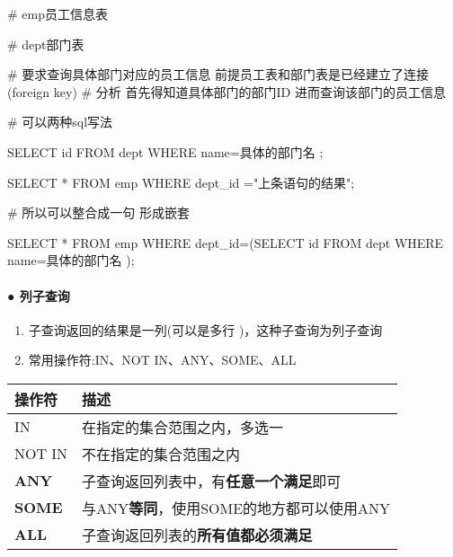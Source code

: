 \documentclass[
  letterpaper,
  DIV=11,
  numbers=noendperiod]{scrreprt}
\let\oldparagraph\paragraph
\renewcommand{\paragraph}[1]{\oldparagraph{#1}\mbox{}}
\newenvironment{Shaded}{\begin{snugshade}}{\end{snugshade}}
\newcommand{\KeywordTok}[1]{\textcolor[rgb]{0.00,0.23,0.31}{#1}}
\newcommand{\NormalTok}[1]{\textcolor[rgb]{0.00,0.23,0.31}{#1}}
\newcommand{\OperatorTok}[1]{\textcolor[rgb]{0.37,0.37,0.37}{#1}}
\newcommand{\OtherTok}[1]{\textcolor[rgb]{0.00,0.23,0.31}{#1}}
\newcommand{\StringTok}[1]{\textcolor[rgb]{0.13,0.47,0.30}{#1}}
\begin{document}
\begin{Shaded}
\begin{Highlighting}[]
\NormalTok{\# emp员工信息表}

\NormalTok{\# dept部门表}

\NormalTok{\# 要求查询具体部门对应的员工信息 前提员工表和部门表是已经建立了连接(}\KeywordTok{foreign} \KeywordTok{key}\NormalTok{) \# 分析 首先得知道具体部门的部门ID 进而查询该部门的员工信息}

\NormalTok{\# 可以两种sql写法}

\KeywordTok{SELECT} \KeywordTok{id} \KeywordTok{FROM}\NormalTok{ dept }\KeywordTok{WHERE}\NormalTok{ name}\OperatorTok{=}\StringTok{\textquotesingle{}具体的部门名 \textquotesingle{}}\NormalTok{;}

\KeywordTok{SELECT} \OperatorTok{*} \KeywordTok{FROM}\NormalTok{ emp }\KeywordTok{WHERE}\NormalTok{ dept\_id }\OperatorTok{=}\OtherTok{"上条语句的结果"}\NormalTok{;}

\NormalTok{\# 所以可以整合成一句 形成嵌套}

\KeywordTok{SELECT} \OperatorTok{*} \KeywordTok{FROM}\NormalTok{ emp }\KeywordTok{WHERE}\NormalTok{ dept\_id}\OperatorTok{=}\NormalTok{(}\KeywordTok{SELECT} \KeywordTok{id} \KeywordTok{FROM}\NormalTok{ dept }\KeywordTok{WHERE}\NormalTok{ name}\OperatorTok{=}\StringTok{\textquotesingle{}具体的部门名 \textquotesingle{}}\NormalTok{);}
\end{Highlighting}
\end{Shaded}

\hypertarget{ux5217ux5b50ux67e5ux8be2}{%
\paragraph{\texorpdfstring{\textbf{●
列子查询}}{● 列子查询}}\label{ux5217ux5b50ux67e5ux8be2}}

\begin{enumerate}
\def\labelenumi{\arabic{enumi}.}
\item
  子查询返回的结果是一列(可以是多行 )，这种子查询为列子查询
\item
  常用操作符:IN、NOT IN、ANY、SOME、ALL
\end{enumerate}

\begin{longtable}[]{@{}ll@{}}
\toprule\noalign{}
\textbf{操作符} & \textbf{描述} \\
\midrule\noalign{}
\endhead
\bottomrule\noalign{}
\endlastfoot
IN & 在指定的集合范围之内，多选一 \\
NOT IN & 不在指定的集合范围之内 \\
\textbf{ANY} & 子查询返回列表中，有\textbf{任意一个满足}即可 \\
\textbf{SOME} & 与ANY\textbf{等同}，使用SOME的地方都可以使用ANY \\
\textbf{ALL} & 子查询返回列表的\textbf{所有值都必须满足} \\
\end{longtable}
\end{document}
